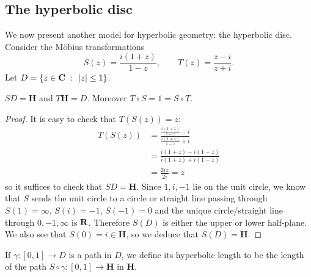\documentclass[12pt]{article}
\begin{document}
\subsection{The hyperbolic disc}

We now present another model for hyperbolic geometry: the hyperbolic disc. Consider the M\"obius transformations
\[S(z)=\frac{i(1+z)}{1-z},\qquad T(z)=\frac{z-i}{z+i}.\]
Let $D=\{z\in\mathbf{C}\ :\ |z|\leq 1\}$.
\begin{lma}
  $SD=\mathbf{H}$ and $T\mathbf{H}=D$. Moreover $T\circ S=1=S\circ T$.
\end{lma}
\begin{proof}
  It is easy to check that $T(S(z))=z$:
  \begin{align*}
    T(S(z))&=\frac{\frac{i(1+z)}{1-z}-i}{\frac{i(1+z)}{1-z}+i}\\
    &=\frac{i(1+z)-i(1-z)}{i(1+z)+i(1-z)}\\
    &=\frac{2iz}{2i}=z
  \end{align*}
  so it suffices to check that $SD=\mathbf{H}$. Since $1,i,-1$ lie on the unit circle, we know that $S$ sends the unit circle to a circle or straight line passing through $S(1)=\infty$, $S(i)=-1$, $S(-1)=0$ and the unique circle/straight line through $0,-1,\infty$ is $\mathbf{R}$. Therefore $S(D)$ is either the upper or lower half-plane. We also see that $S(0)=i\in\mathbf{H}$, so we deduce that $S(D)=\mathbf{H}$.
\end{proof}

\begin{dfn}
  If $\gamma\colon[0,1]\to D$ is a path in $D$, we define its hyperbolic length to be the length of the path $S\circ\gamma\colon[0,1]\to\mathbf{H}$ in $\mathbf{H}$.
\end{dfn}
\end{document}
